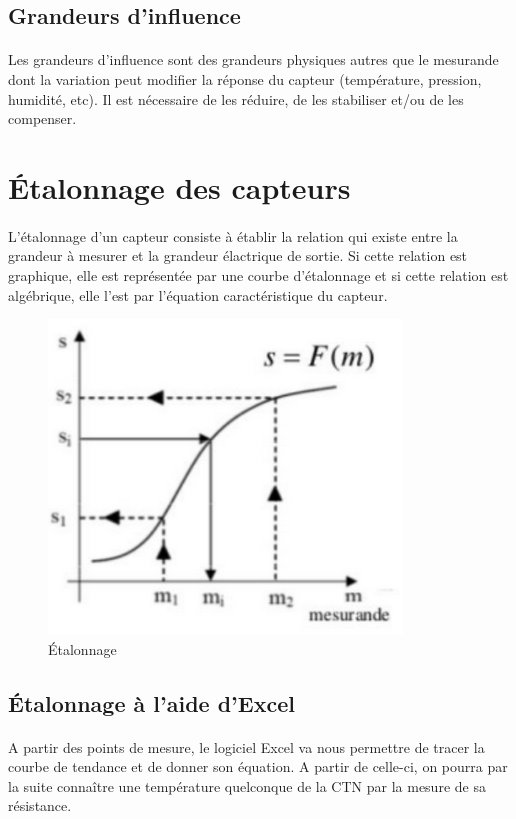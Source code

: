 \documentclass{article}
\begin{document}
        \subsection{Grandeurs d'influence}
        \paragraph{}
        Les grandeurs d'influence sont des grandeurs physiques autres que le mesurande dont la variation peut modifier la réponse du capteur (température, pression, humidité, etc). Il est nécessaire de les réduire, de les stabiliser et/ou de les compenser.


    \section{Étalonnage des capteurs}
    \paragraph{}
    L'étalonnage d'un capteur consiste à établir la relation qui existe entre la grandeur à mesurer et la grandeur élactrique de sortie. Si cette relation est graphique, elle est représentée par une courbe d'étalonnage et si cette relation est algébrique, elle l'est par l'équation caractéristique du capteur.

    \begin{figure}[H]
        \centering
        \includegraphics[width=0.3\linewidth]{./images/008-etalonnage.png}
        \caption{Étalonnage}
    \end{figure}

        \subsection{Étalonnage à l'aide d'Excel}
        \paragraph{}
        A partir des points de mesure, le logiciel Excel va nous permettre de tracer la courbe de tendance et de donner son équation. A partir de celle-ci, on pourra par la suite connaître une température quelconque de la CTN par la mesure de sa résistance.
\end{document}
